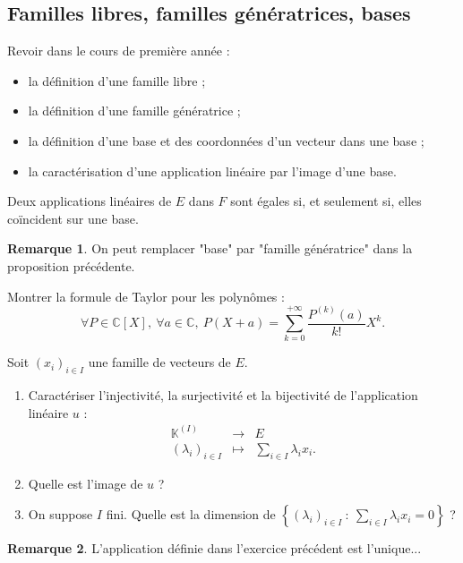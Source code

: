 \documentclass[french]{article}
\newcommand{\C}{\mathbb{C}}
\newcommand{\K}{\mathbb{K}}
\theoremstyle{plain}
\theoremstyle{definition}
\newtheorem*{rmq}{Remarque}
\theoremstyle{remark}
\begin{document}
\subsection{Familles libres, familles génératrices, bases}
Revoir dans le cours de première année :
\begin{itemize}
	\item la définition d'une famille libre ;
	\item la définition d'une famille génératrice ;
	\item la définition d'une base et des coordonnées d'un vecteur dans une base ;
	\item la caractérisation d'une application linéaire par l'image d'une base.
\end{itemize}

\begin{thm}
	Deux applications linéaires de $E$ dans $F$ sont égales si, et seulement si, elles coïncident sur une base.
\end{thm}

\begin{rmq}
	On peut remplacer "base" par "famille génératrice" dans la proposition précédente.
\end{rmq}

\begin{exo}
	Montrer la formule de Taylor pour les polynômes : $$\forall P\in\C[X],\ \forall a\in\C,\ P(X+a)=\sum_{k=0}^{+\infty}\frac{P^{(k)}(a)}{k!}X^k.$$
\end{exo}%

\begin{exo}
	Soit $(x_i)_{i\in I}$ une famille de vecteurs de $E$.
	\begin{enumerate}
		\item Caractériser l'injectivité, la surjectivité et la bijectivité de l'application linéaire $u$ : $$\begin{array}{rcl}
			\K^{(I)}&\longrightarrow&E \\
			(\lambda_i)_{i\in I}&\longmapsto&\displaystyle\sum_{i\in I}\lambda_i x_i.
		\end{array}$$
		\item Quelle est l'image de $u$ ?
		\item On suppose $I$ fini. Quelle est la dimension de $\displaystyle\left\{(\lambda_i)_{i\in I}\ : \ \sum_{i\in I}\lambda_ix_i=0\right\}$ ?
	\end{enumerate}
\end{exo}

\begin{rmq}
	L'application définie dans l'exercice précédent est l'unique... %
\end{rmq}
\end{document}
